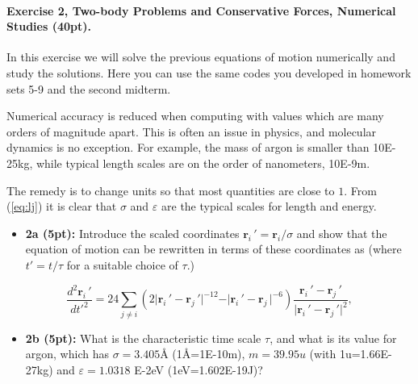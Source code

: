 \documentclass[%
oneside,                 %
final,                   %
10pt]{article}
\begin{document}
\paragraph{Exercise 2, Two-body Problems and Conservative Forces, Numerical Studies (40pt).}
In this exercise we will solve the previous equations of motion numerically and study the solutions.
Here you can use the same codes you developed in homework sets 5-9 and the second midterm.

Numerical accuracy is reduced when computing with values which are
many orders of magnitude apart. This is often an issue in physics, and
molecular dynamics is no exception. For example, the mass of argon is
smaller than 10E-25kg, while typical length scales are
on the order of nanometers, 10E-9m.

The remedy is to change units so that most quantities are close to
$1$. From (\ref{eq:lj}) it is clear that $\sigma$ and $\varepsilon$
are the typical scales for length and energy.

\begin{itemize}
\item \textbf{2a (5pt):} Introduce the scaled coordinates $\bm{r}_i\,'=\bm{r}_i/\sigma$ and show that the equation of motion can be rewritten in terms of these coordinates as (where $t'=t/\tau$ for a suitable choice of $\tau$.)
\end{itemize}

\noindent
\begin{equation}
\frac{d^2\bm{r}_i\,'}{{dt'^2}} = 24 \sum_{j \neq i} \left(2\vert\bm{r}_i\,'-\bm{r}_j\,'\vert^{-12}-\vert\bm{r}_i\,'-\bm{r}_j\,\vert^{-6}\right)\frac{\bm{r}_i\,'-\bm{r}_j\,'}{\vert\bm{r}_i\,'-\bm{r}_j\,'\vert^2}, \label{eq:undim}
\end{equation}
\begin{itemize}
\item \textbf{2b (5pt):} What is the characteristic time scale $\tau$, and what is its value for argon, which has $\sigma=3.405$Å (1Å=1E-10m), $m = 39.95u$ (with 1u=1.66E-27kg) and $\varepsilon=1.0318$ E-2eV (1eV=1.602E-19J)?
\end{itemize}
\end{document}
